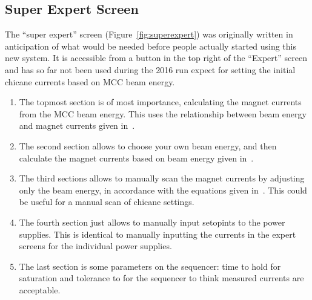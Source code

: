 \documentclass[amsmath,amssymb,notitlepage,11pt]{revtex4-1}
\begin{document}
\subsection{Super Expert Screen}
The ``super expert'' screen (Figure~\ref{fig:superexpert}) was originally written in anticipation of what would be needed before people actually started using this new system.  It is accessible from a button in the top right of the ``Expert'' screen and has so far not been used during the 2016 run expect for setting the initial chicane currents based on MCC beam energy.
\begin{enumerate}
\item The topmost section is of most importance, calculating the magnet currents from the MCC beam energy.  This uses the relationship between beam energy and magnet currents given in~\cite{chicaneSettings}.
\item
    The second section allows to choose your own beam energy, and then calculate the magnet currents based on beam energy given in~\cite{chicaneSettings}.
\item
The third sections allows to manually scan the magnet currents by adjusting only the beam energy, in accordance with the equations given in~\cite{chicaneSettings}.  This could be useful for a manual scan of chicane settings.
\item
The fourth section just allows to manually input setopints to the power supplies.  This is identical to manually inputting the currents in the expert screens for the individual power supplies.
\item
The last section is some parameters on the sequencer: time to hold for saturation and tolerance to for the sequencer to think measured currents are acceptable.
\end{enumerate}
\end{document}
